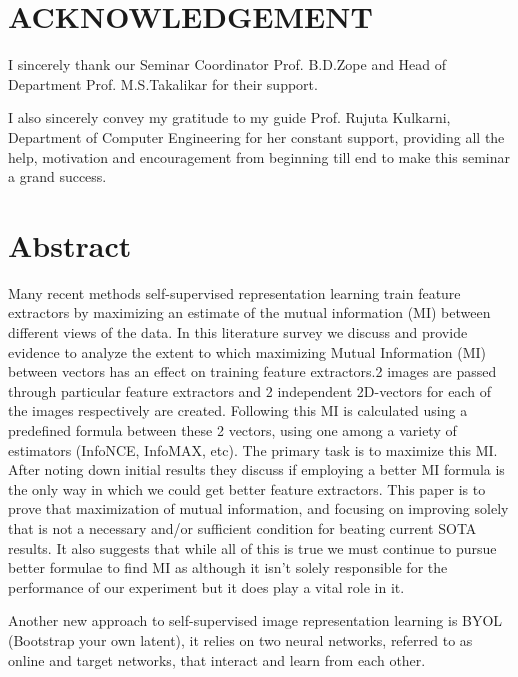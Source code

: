 \documentclass[a4paper, 12pt]{article}
\begin{document}
\section*{ACKNOWLEDGEMENT}

\hspace{0.5cm} I sincerely thank our Seminar Coordinator Prof. B.D.Zope and Head of Department Prof. M.S.Takalikar
for their support.
\vspace{0.25cm}
\par I also sincerely convey my gratitude to my guide Prof. Rujuta Kulkarni, Department of Computer Engineering for her constant
support, providing all the help, motivation and encouragement from beginning till end to make this seminar a grand success.
\vspace{0.25cm}
\par

\newpage
\tableofcontents

\newpage
\listoftables
\listoffigures

\newpage

\section*{Abstract}
Many recent methods self-supervised representation learning train feature extractors by maximizing an estimate of the mutual information (MI) between different views of the data. In this literature survey we discuss and provide evidence to analyze the extent to which maximizing Mutual Information (MI) between vectors has an effect on training feature extractors.2 images are passed through particular feature extractors and  2 independent 2D-vectors for each of the images respectively are created. Following this MI is calculated using a predefined formula between these 2 vectors, using one among a variety of estimators (InfoNCE, InfoMAX, etc). The primary task is to maximize this MI. After noting down initial results they discuss if employing a better MI formula is the only way in which we could get better feature extractors. This paper is to prove that maximization of mutual information, and focusing on improving solely that is not a necessary and/or sufficient condition for beating current SOTA results. It also suggests that while all of this is true we must continue to pursue better formulae to find MI as although it isn’t solely responsible for the performance of our experiment but it does play a vital role in it.
\par 
Another new approach to self-supervised image
representation learning is BYOL (Bootstrap your own latent), it relies on two neural networks, referred to as online and target
networks, that interact and learn from each other.
\end{document}
